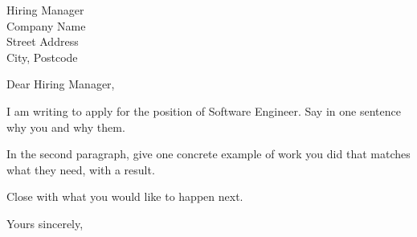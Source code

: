 \documentclass[11pt]{letter}
\begin{document}
\begin{letter}{Hiring Manager \\ Company Name \\ Street Address \\ City, Postcode}

\opening{Dear Hiring Manager,}

I am writing to apply for the position of Software Engineer. Say in one sentence why you and why them.

In the second paragraph, give one concrete example of work you did that matches what they need, with a result.

Close with what you would like to happen next.

\closing{Yours sincerely,}

\end{letter}
\end{document}
